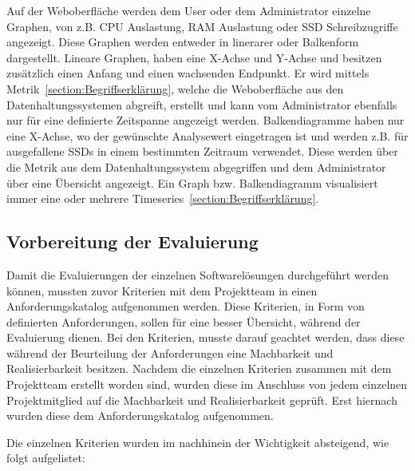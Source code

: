 Auf der Weboberfläche werden dem User oder dem Administrator einzelne Graphen,
von z.B. CPU Auslastung, RAM Auslastung oder SSD Schreibzugriffe angezeigt.
Diese Graphen werden entweder in linerarer oder Balkenform dargestellt.
Lineare Graphen, haben eine X-Achse und Y-Achse und besitzen zusätzlich einen
Anfang und einen wachsenden Endpunkt. Er wird mittels
Metrik~\ref{section:Begriffserklärung}, welche die Weboberfläche aus den
Datenhaltungssystemen abgreift, erstellt und kann vom Administrator ebenfalls
nur für eine definierte Zeitspanne angezeigt werden. Balkendiagramme haben nur
eine X-Achse, wo der gewünschte Analysewert eingetragen ist und werden z.B. für
ausgefallene SSDs in einem bestimmten Zeitraum verwendet. Diese werden über die
Metrik aus dem Datenhaltungssystem abgegriffen und dem Administrator über eine
Übersicht angezeigt. Ein Graph bzw. Balkendiagramm visualisiert immer eine oder
mehrere Timeseries~\ref{section:Begriffserklärung}.

\subsection{Vorbereitung der Evaluierung}
\label{subsec:vorbereiten_der_evaluierung_frontend}
Damit die Evaluierungen der einzelnen Softwarelösungen durchgeführt werden
können, mussten zuvor Kriterien mit dem Projektteam in einen
Anforderungskatalog aufgenommen werden. Diese Kriterien, in Form von
definierten Anforderungen, sollen für eine besser Übersicht, während der
Evaluierung dienen. Bei den Kriterien, musste darauf geachtet werden, dass
diese während der Beurteilung der Anforderungen eine Machbarkeit und
Realisierbarkeit besitzen. Nachdem die einzelnen Kriterien zusammen mit dem
Projektteam erstellt worden sind, wurden diese im Anschluss von jedem einzelnen
Projektmitglied auf die Machbarkeit und Realisierbarkeit geprüft. Erst hiernach
wurden diese dem Anforderungskatalog aufgenommen.

Die einzelnen Kriterien wurden im nachhinein der Wichtigkeit absteigend,
wie folgt aufgelistet:

